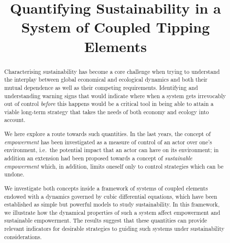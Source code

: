 \documentclass[conference]{IEEEtran}
\begin{document}
\title{Quantifying Sustainability in a System of Coupled Tipping Elements}

\author{
\and
{}
}

\maketitle

\begin{abstract}
  Characterising sustainability has become a core challenge when
  trying to understand the interplay between global economical and
  ecological dynamics and both their mutual dependence as well as
  their competing requirements. Identifying and understanding warning
  signs that would indicate where when a system gets irrevocably out
  of control \emph{before} this happens would be a critical tool in
  being able to attain a viable long-term strategy that takes the
  needs of both economy and ecology into account.

  We here explore a route towards such  quantities. In the last years,
  the concept of \emph{empowerment} has been investigated as a measure
  of control of an actor over one's environment, i.e.\ the potential
  impact that an actor can have on its environment; in addition an
  extension had been proposed towards a concept of \emph{sustainable
    empowerment} which, in addition, limits oneself only to control
  strategies which can be undone.

  We investigate both concepts inside a framework of systems of
  coupled elements endowed with a dynamics governed by cubic
  differential equations, which have been established as simple but powerful
  models to study sustainability. %
  In this framework, we illustrate how the dynamical properties of
  such a system affect empowerment and sustainable empowerment. The
  results suggest that these quantities can provide relevant
  indicators for desirable strategies to guiding such systems under
  sustainability considerations.
\end{abstract}
\end{document}
